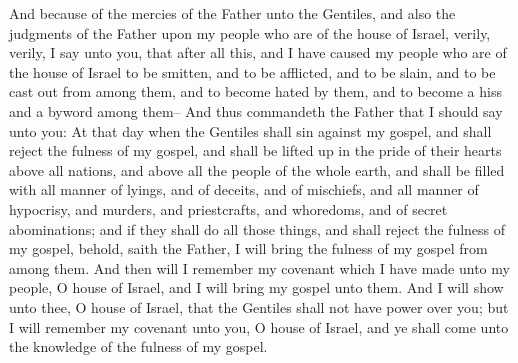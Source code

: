 And because of the mercies of the Father unto the Gentiles, and also the judgments of the Father upon my people who are of the house of Israel, verily, verily, I say unto you, that after all this, and I have caused my people who are of the house of Israel to be smitten, and to be afflicted, and to be slain, and to be cast out from among them, and to become hated by them, and to become a hiss and a byword among them--
\bverse \iffalse And thus commandeth the Father that I should say unto you: At that day when the Gentiles shall sin against my gospel, and shall reject the fulness of my gospel, and shall be lifted up in the pride of their hearts above all nations, and above all the people of the whole earth, and shall be filled with all manner of lyings, and of deceits, and of mischiefs, and all manner of hypocrisy, and murders, and priestcrafts, and whoredoms, and of secret abominations; and if they shall do all those things, and shall reject the fulness of my gospel, behold, saith the Father, I will bring the fulness of my gospel from among them. \fi
And thus commandeth the Father that I should say unto you: At that day when the Gentiles shall sin against my gospel, and shall reject the fulness of my gospel, and shall be lifted up in the pride of their hearts above all nations, and above all the people of the whole earth, and shall be filled with all manner of lyings, and of deceits, and of mischiefs, and all manner of hypocrisy, and murders, and priestcrafts, and whoredoms, and of secret abominations; and if they shall do all those things, and shall reject the fulness of my gospel, behold, saith the Father, I will bring the fulness of my gospel from among them.
\bverse \iffalse And then will I remember my covenant which I have made unto my people, O house of Israel, and I will bring my gospel unto them. \fi
And then will I remember my covenant which I have made unto my people, O house of Israel, and I will bring my gospel unto them.
\bverse \iffalse And I will show unto thee, O house of Israel, that the Gentiles shall not have power over you; but I will remember my covenant unto you, O house of Israel, and ye shall come unto the knowledge of the fulness of my gospel. \fi
And I will show unto thee, O house of Israel, that the Gentiles shall not have power over you; but I will remember my covenant unto you, O house of Israel, and ye shall come unto the knowledge of the fulness of my gospel.
\bverse \iffalse But if the Gentiles will repent and return unto me, saith the Father, behold they shall be numbered among my people, O house of Israel. \fi
